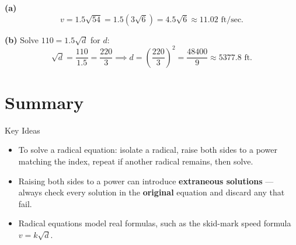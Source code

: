 \documentclass[12pt]{article}
\begin{document}
\begin{solutionbox}
\textbf{(a)} 
\[
v=1.5\sqrt{54}=1.5(3\sqrt6)=4.5\sqrt6\approx 11.02 \text{ ft/sec}.
\]

\textbf{(b)} Solve $110=1.5\sqrt{d}$ for $d$:
\[
\sqrt d=\frac{110}{1.5}=\frac{220}{3} \implies d=\left(\frac{220}{3}\right)^2=\frac{48400}{9}\approx 5377.8 \text{ ft}.
\]
\end{solutionbox}

\section*{Summary}

\begin{friendlyrule}{Key Ideas}
\begin{itemize}
    \item To solve a radical equation: isolate a radical, raise both sides to a power matching the index, repeat if another radical remains, then solve.
    \item Raising both sides to a power can introduce \textbf{extraneous solutions} --- always check every solution in the \textbf{original} equation and discard any that fail.
    \item Radical equations model real formulas, such as the skid-mark speed formula $v=k\sqrt{d}$.
\end{itemize}
\end{friendlyrule}
\end{document}

